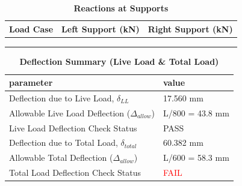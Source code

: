 \documentclass[12pt,a4paper]{report}
\numberwithin{table}{chapter}
\numberwithin{figure}{chapter}
\begin{document}
\vspace{1em}
\begin{longtable}{|>{\centering\arraybackslash}p{5.2cm}|>{\centering\arraybackslash}p{5.2cm}|>{\centering\arraybackslash}p{5.2cm}|}
\caption{\textbf{Reactions at Supports}}
\hline
\textbf{Load Case} & \textbf{Left Support (kN)} & \textbf{Right Support (kN)} \\[6pt]
\hline
 &  &  \\[6pt]
\hline
 &  &  \\[6pt]
\hline
 &  &  \\[6pt]
\hline
\end{longtable}

\vspace{1em}
\begin{longtable}{|L{7cm}|p{8.5cm}|}
\caption{\textbf{Deflection Summary (Live Load \& Total Load)}}
\hline
\textbf{parameter} & \textbf{value} \\
\hline
\textnormal{Deflection due to Live Load, $\delta_{LL}$} & 17.560 mm \\[6pt]
\hline
\textnormal{Allowable Live Load Deflection ($\Delta_{allow}$)} & L/800 = 43.8 mm \\[6pt]
\hline
\textnormal{Live Load Deflection Check Status} & PASS \\[6pt]
\hline
\textnormal{Deflection due to Total Load, $\delta_{total}$} & 60.382 mm \\[6pt]
\hline
\textnormal{Allowable Total Deflection ($\Delta_{allow}$)} & L/600 = 58.3 mm \\[6pt]
\hline
\textnormal{Total Load Deflection Check Status} & \textcolor{red}{FAIL} \\[6pt]
\hline
\end{longtable}
\end{document}
